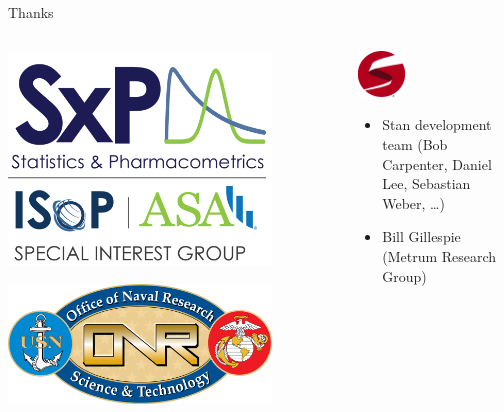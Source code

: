 \documentclass[bigger]{beamer}
\begin{document}
\begin{frame}[label={sec:orgd89d1d8}]{Thanks}
\begin{columns}
\begin{column}{0.5\columnwidth}
\begin{center}
\includegraphics[width=0.8\textwidth]{./figure/sxplogo.png}
\end{center}
\begin{center}
\includegraphics[width=0.8\textwidth]{./figure/onr_logo.png}
\end{center}
\end{column}

\begin{column}{0.5\columnwidth}
\begin{center}
\includegraphics[width=0.3\textwidth]{./figure/stan_logo.png}
\end{center}

\begin{itemize}
\item Stan development team (Bob Carpenter, Daniel Lee, Sebastian Weber, \ldots{})
\item Bill Gillespie (Metrum Research Group)
\end{itemize}
\end{column}
\end{columns}
\end{frame}
\end{document}
